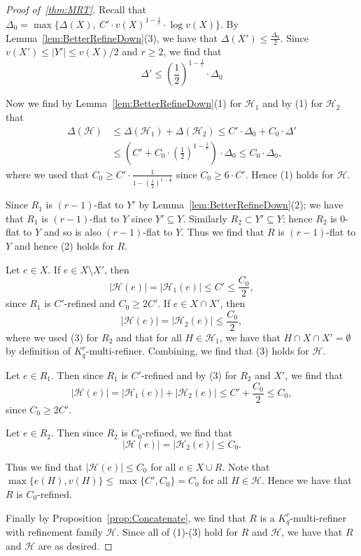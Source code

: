 \documentclass[11pt]{article}
\newcounter{i}
\theoremstyle{plain}
\renewcommand{\theclaim}{\thetheorem.\arabic{claim}}
\newenvironment{lateproof}[1]
 {%
  \renewcommand{\theclaim}{\ref{#1}.\arabic{claim}}%
  \begin{proof}[Proof of~\cref{#1}]%
 }
 {\end{proof}}
\theoremstyle{plain} %
\theoremstyle{definition}
\begin{document}
\begin{lateproof}{thm:MRT}
Recall that $\Delta_0= \max \{\Delta(X),~C'\cdot v(X)^{1-\frac{1}{r}}\cdot \log v(X)\}$. By Lemma~\ref{lem:BetterRefineDown}(3), we have that $\Delta(X')\le \frac{\Delta_0}{2}$. Since $v(X')\le |Y'|\le v(X)/2$ and $r\ge 2$, we find that 
$$\Delta'\le \left(\frac{1}{2}\right)^{1-\frac{1}{r}}\cdot \Delta_0$$

Now we find by Lemma~\ref{lem:BetterRefineDown}(1) for $\mathcal{H}_1$ and by (1) for $\mathcal{H}_2$ that
\begin{align*}
\Delta(\mathcal{H}) &\le \Delta(\mathcal{H}_1)+\Delta(\mathcal{H}_2) \le C' \cdot \Delta_0 + C_0 \cdot \Delta' \\
&\le \left(C'+C_0\cdot \left(\frac{1}{2}\right)^{1-\frac{1}{r}}\right)\cdot \Delta_0 \le C_0\cdot \Delta_0,
\end{align*}
where we used that $C_0\ge C'\cdot \frac{1}{1-\left(\frac{1}{2}\right)^{1-\frac{1}{r}}}$ since $C_0\ge 6\cdot C'$. Hence (1) holds for $\mathcal{H}$. 

Since $R_1$ is $(r-1)$-flat to $Y'$ by Lemma~\ref{lem:BetterRefineDown}(2); we have that $R_1$ is $(r-1)$-flat to $Y$ since $Y'\subseteq Y$. Similarly $R_2\subset Y'\subseteq Y$; hence $R_2$ is $0$-flat to $Y$ and so is also $(r-1)$-flat to $Y$. Thus we find that $R$ is $(r-1)$-flat to $Y$ and hence (2) holds for $R$. 

Let $e\in X$. If $e\in X\setminus X'$, then $$|\mathcal{H}(e)| = |\mathcal{H}_1(e)| \le C'\le \frac{C_0}{2},$$
since $R_1$ is $C'$-refined and $C_0\ge 2C'$. If $e\in X\cap X'$, then 
$$|\mathcal{H}(e)| = |\mathcal{H}_2(e)| \le \frac{C_0}{2},$$
where we used (3) for $R_2$ and that for all $H\in \mathcal{H}_1$, we have that $H\cap X\cap X'=\emptyset$ by definition of $K_q^r$-multi-refiner. Combining, we find that (3) holds for $\mathcal{H}$. 

Let $e\in R_1$. Then since $R_1$ is $C'$-refined and by (3) for $R_2$ and $X'$, we find that
$$|\mathcal{H}(e)| = |\mathcal{H}_1(e)| + |\mathcal{H}_2(e)| \le C' + \frac{C_0}{2} \le C_0,$$
since $C_0\ge 2C'$. 

Let $e\in R_2$. Then since $R_2$ is $C_0$-refined, we find that
$$|\mathcal{H}(e)| = |\mathcal{H}_2(e)| \le C_0.$$

Thus we find that $|\mathcal{H}(e)|\le C_0$ for all $e\in X\cup R$. Note that $\max\{e(H),v(H)\} \le \max\{C',C_0\} = C_0$ for all $H\in \mathcal{H}$. Hence we have that $R$ is $C_0$-refined.

Finally by Proposition~\ref{prop:Concatenate}, we find that $R$ is a $K_q^r$-multi-refiner with refinement family $\mathcal{H}$. Since all of (1)-(3) hold for $R$ and $\mathcal{H}$, we have that $R$ and $\mathcal{H}$ are as desired.
\end{lateproof}
\end{document}
